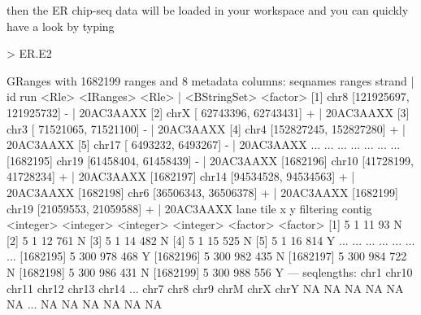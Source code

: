 \documentclass[12pt]{article}
\begin{document}
then the ER chip-seq data \cite{Hu:2010uq} will be loaded in your workspace and you can quickly have a look by typing
\begin{Schunk}
\begin{Sinput}
> ER.E2
\end{Sinput}
\begin{Soutput}
GRanges with 1682199 ranges and 8 metadata columns:
            seqnames                 ranges strand   |           id       run
               <Rle>              <IRanges>  <Rle>   | <BStringSet>  <factor>
        [1]     chr8 [121925697, 121925732]      -   |              20AC3AAXX
        [2]     chrX [ 62743396,  62743431]      +   |              20AC3AAXX
        [3]     chr3 [ 71521065,  71521100]      -   |              20AC3AAXX
        [4]     chr4 [152827245, 152827280]      +   |              20AC3AAXX
        [5]    chr17 [  6493232,   6493267]      -   |              20AC3AAXX
        ...      ...                    ...    ... ...          ...       ...
  [1682195]    chr19   [61458404, 61458439]      -   |              20AC3AAXX
  [1682196]    chr10   [41728199, 41728234]      +   |              20AC3AAXX
  [1682197]    chr14   [94534528, 94534563]      +   |              20AC3AAXX
  [1682198]     chr6   [36506343, 36506378]      +   |              20AC3AAXX
  [1682199]    chr19   [21059553, 21059588]      +   |              20AC3AAXX
                 lane      tile         x         y filtering   contig
            <integer> <integer> <integer> <integer>  <factor> <factor>
        [1]         5         1        11        93         N         
        [2]         5         1        12       761         N         
        [3]         5         1        14       482         N         
        [4]         5         1        15       525         N         
        [5]         5         1        16       814         Y         
        ...       ...       ...       ...       ...       ...      ...
  [1682195]         5       300       978       468         Y         
  [1682196]         5       300       982       435         N         
  [1682197]         5       300       984       722         N         
  [1682198]         5       300       986       431         N         
  [1682199]         5       300       988       556         Y         
  ---
  seqlengths:
    chr1 chr10 chr11 chr12 chr13 chr14 ...  chr7  chr8  chr9  chrM  chrX  chrY
      NA    NA    NA    NA    NA    NA ...    NA    NA    NA    NA    NA    NA
\end{Soutput}
\begin{Sinput}

\end{Sinput}
\end{Schunk}
\end{document}

